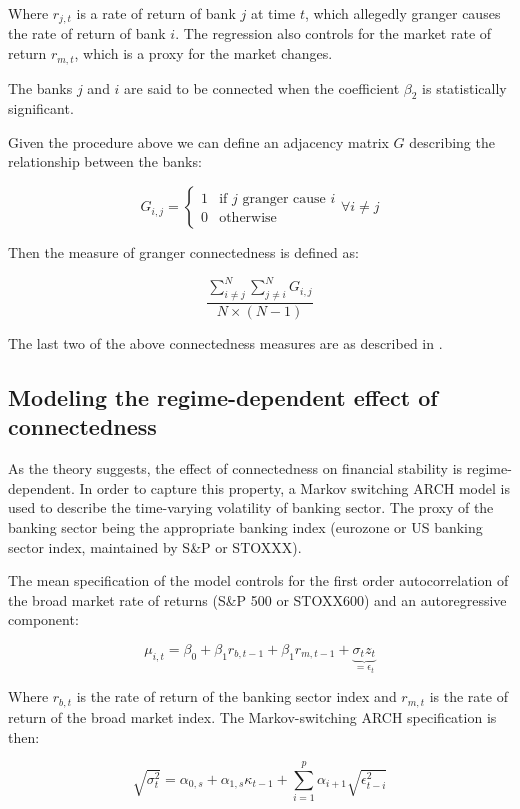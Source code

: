 \documentclass{article}
\begin{document}
Where $r_{j, t}$ is a rate of return of bank $j$ at time $t$, which allegedly granger causes the rate of return of bank $i$. The regression also controls for the market rate of return $r_{m, t}$, which is a proxy for the market changes.

The banks $j$ and $i$ are said to be connected when the coefficient $\beta_2$ is statistically significant. 

Given the procedure above we can define an adjacency matrix $G$ describing the relationship between the banks:

\[G_{i,j} = \begin{cases}
    1  & \text{if } j \text{ granger cause } i \\
    0 & \text{otherwise}
  \end{cases} \forall i \neq j\]

Then the measure of granger connectedness is defined as:

\[\frac{\sum_{i \neq j}^{N} \sum_{j \neq i}^{N} G_{i,j}}{ N \times (N-1)}\]

The last two of the above connectedness measures are as described in \citet{billio}.

\subsection*{Modeling the regime-dependent effect of connectedness}

As the theory suggests, the effect of connectedness on financial stability is regime-dependent. In order to capture this property, a Markov switching ARCH model is used to describe the time-varying volatility of banking sector. The proxy of the banking sector being the appropriate banking index (eurozone or US banking sector index, maintained by S\&P or STOXXX).

The mean specification of the model controls for the first order autocorrelation of the broad market rate of returns (S\&P 500 or STOXX600) and an autoregressive component:

\[\mu_{i,t} = \beta_0 + \beta_1 r_{b,t-1} + \beta_1 r_{m,t-1} + \underbrace{\sigma_t z_t}_{=\epsilon_t}\]

Where $r_{b,t}$ is the rate of return of the banking sector index and $r_{m,t}$ is the rate of return of the broad market index. The Markov-switching ARCH specification is then:

\[\sqrt{\sigma^2_t} = \alpha_{0,s} + \alpha_{1,s} \kappa_{t-1} + \sum_{i=1}^{p} \alpha_{i+1} \sqrt{\epsilon^2_{t-i}}\]
\end{document}
